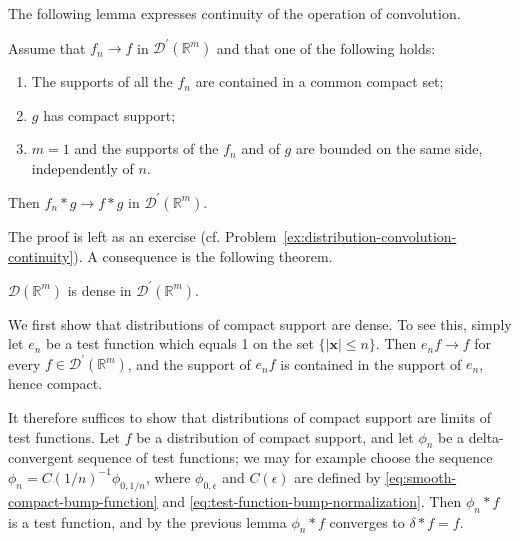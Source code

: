 The following lemma expresses continuity of the operation of convolution.

\begin{Lemma}
\label{lem:distribution-convolution-continuity}
Assume that $f_n\to f$ in $\mathcal{D}^{\prime}(\mathbb{R}^m)$ and that one of the following holds:
\begin{enumerate}
\item The supports of all the $f_n$ are contained in a common compact set;
\item $g$ has compact support;
\item $m=1$ and the supports of the $f_n$ and of $g$ are bounded on the same side, independently of $n$.
\end{enumerate}
Then $f_n*g\to f*g$ in $\mathcal{D}^{\prime}(\mathbb{R}^m)$.
\end{Lemma}

The proof is left as an exercise (cf. Problem~\ref{ex:distribution-convolution-continuity}). A consequence is the following theorem.

\begin{Theorem}
\label{thm:test-functions-dense-distributions}
$\mathcal{D}(\mathbb{R}^m)$ is dense in $\mathcal{D}^{\prime}(\mathbb{R}^m)$.
\end{Theorem}

\begin{Proof}
We first show that distributions of compact support are dense. To see this, simply let $e_n$ be a test function which equals 1 on the set $\{|\bm{x}|\leq n\}$. Then $e_nf\to f$ for every $f\in\mathcal{D}^{\prime}(\mathbb{R}^m)$, and the support of $e_nf$ is contained in the support of $e_n$, hence compact.

It therefore suffices to show that distributions of compact support are limits of test functions. Let $f$ be a distribution of compact support, and let $\phi_n$ be a delta-convergent sequence of test functions; we may for example choose the sequence $\phi_n=C(1/n)^{-1}\phi_{0,1/n}$, where $\phi_{0,\epsilon}$ and $C(\epsilon)$ are defined by \eqref{eq:smooth-compact-bump-function} and \eqref{eq:test-function-bump-normalization}. Then $\phi_n*f$ is a test function, and by the previous lemma $\phi_n*f$ converges to $\delta*f=f$.
\end{Proof}
